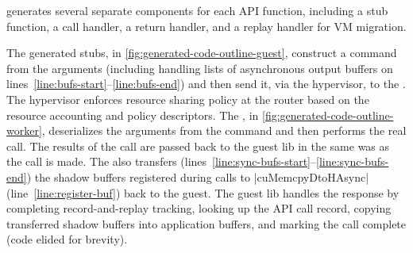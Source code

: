 {\Compiler generates several separate components for each API function, including a stub function, a call handler, a return handler, and a replay handler for VM migration.



The generated stubs, in \autoref{fig:generated-code-outline-guest}, construct a command from the arguments (including handling lists of asynchronous output buffers on lines~\ref{line:bufs-start}--\ref{line:bufs-end}) and then send it, via the hypervisor, to the \worker.
The hypervisor enforces resource sharing policy at the router based on the resource accounting and policy descriptors.
The \worker, in \autoref{fig:generated-code-outline-worker}, deserializes the arguments from the command and then performs the real call.
The results of the call are passed back to the guest lib in the same was as the call is made.
The \worker also transfers (lines~\ref{line:sync-bufs-start}--\ref{line:sync-bufs-end}) the shadow buffers registered during calls to \spec|cuMemcpyDtoHAsync| (line~\ref{line:register-buf}) back to the guest.
The guest lib handles the response by completing record-and-replay tracking, looking up the API call record, copying transferred shadow buffers into application buffers, and marking the call complete (code elided for brevity).

%

}
